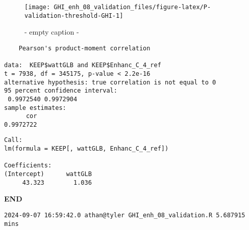 \documentclass[
  10pt,
  a4paper,oneside]{article}
\begin{document}
\newpage

\begin{figure}[H]

{\centering \texttt{[image: GHI\_enh\_08\_validation\_files/figure-latex/P-validation-threshold-GHI-1]} 

}

\caption{ - empty caption - }\label{fig:P-validation-threshold-GHI}
\end{figure}

\begin{verbatim}
    Pearson's product-moment correlation

data:  KEEP$wattGLB and KEEP$Enhanc_C_4_ref
t = 7938, df = 345175, p-value < 2.2e-16
alternative hypothesis: true correlation is not equal to 0
95 percent confidence interval:
 0.9972540 0.9972904
sample estimates:
      cor 
0.9972722 
\end{verbatim}

\begin{verbatim}
Call:
lm(formula = KEEP[, wattGLB, Enhanc_C_4_ref])

Coefficients:
(Intercept)      wattGLB  
     43.323        1.036  
\end{verbatim}

\textbf{END}

\begin{verbatim}
2024-09-07 16:59:42.0 athan@tyler GHI_enh_08_validation.R 5.687915 mins
\end{verbatim}
\end{document}
